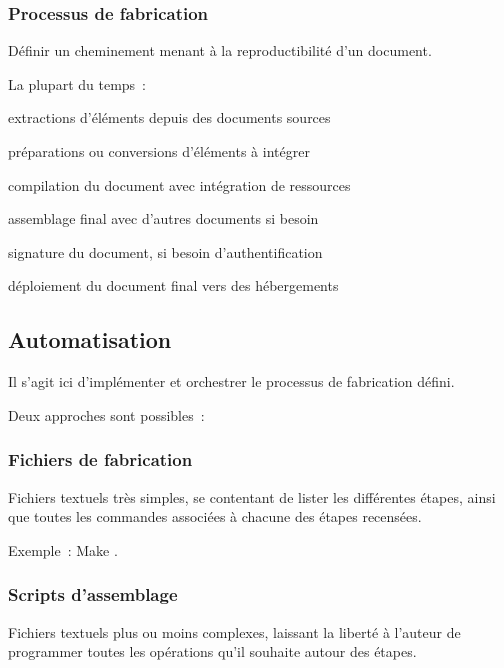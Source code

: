 \pagebreak

\subsubsection{Processus de fabrication}

Définir un cheminement menant à la reproductibilité d’un document.

La plupart du temps :
\begin{itmz}
\item{extractions d’éléments depuis des documents sources}
\item{préparations ou conversions d’éléments à intégrer}
\item{compilation du document avec intégration de ressources}
\item{assemblage final avec d’autres documents si besoin}
\item{signature du document, si besoin d’authentification}
\item{déploiement du document final vers des hébergements}
\end{itmz}

\hr

\subsection{Automatisation}

Il s’agit ici d’implémenter et orchestrer le processus de fabrication défini.

Deux approches sont possibles :

\subsubsection{Fichiers de fabrication}

Fichiers textuels très simples, se contentant de lister les différentes étapes,
ainsi que toutes les commandes associées à chacune des étapes recensées.

Exemple : Make \cite{make}.

\subsubsection{Scripts d’assemblage}

Fichiers textuels plus ou moins complexes, laissant la liberté à l’auteur
de programmer toutes les opérations qu’il souhaite autour des étapes.

